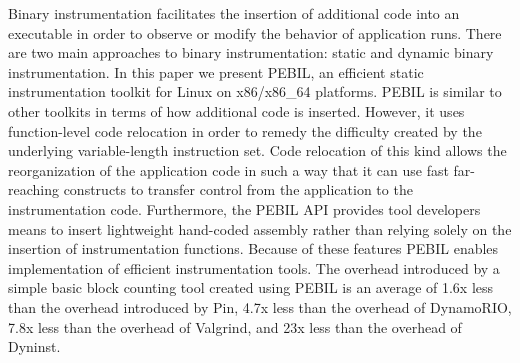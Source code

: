 \begin{it}

Binary instrumentation facilitates the insertion of additional code into an
executable in order to observe or modify the behavior of application runs. 
There are two main approaches to binary instrumentation: static and dynamic
binary instrumentation. In this paper we present PEBIL, an efficient static 
instrumentation toolkit for Linux on x86/x86\_64 platforms. PEBIL
is similar to  other toolkits in terms of how additional code is inserted. However, it uses function-level
code relocation in order to remedy the difficulty created by the underlying variable-length instruction set. 
Code relocation of this kind allows the reorganization of the application code in such a way that it
can use fast far-reaching constructs to transfer control
from the application to the instrumentation code. Furthermore, the PEBIL API provides 
tool developers means to insert lightweight hand-coded assembly
rather than relying solely on the insertion of instrumentation functions.
Because of these features PEBIL enables implementation of efficient instrumentation tools. 
The overhead introduced by a simple basic block counting tool created using PEBIL is an
average of 1.6x less than the overhead introduced by Pin, 4.7x less than the overhead of
DynamoRIO, 7.8x less than the overhead of Valgrind, and 23x less than the overhead of Dyninst.

\end{it}
